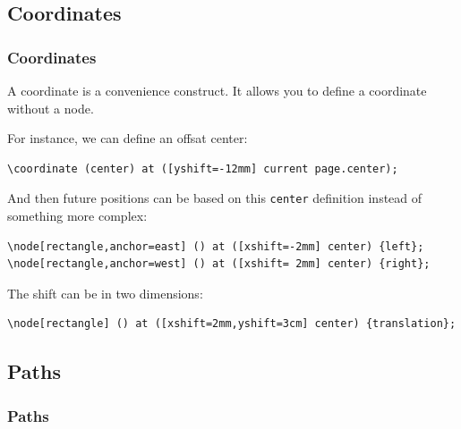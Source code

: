 \subsection{Coordinates}
\begin{frame}[fragile]
  \frametitle{Coordinates}
  \vspace{3mm}
  A coordinate is a convenience construct. It allows you to define a coordinate without a node.
  
  \pause
  \vspace{5mm}
  For instance, we can define an offsat center:
  \begin{verbatim}
\coordinate (center) at ([yshift=-12mm] current page.center);
  \end{verbatim}
  
  \pause
  \vspace{5mm}
  And then future positions can be based on this \texttt{center} definition instead of something more complex:
  \begin{verbatim}
\node[rectangle,anchor=east] () at ([xshift=-2mm] center) {left};
\node[rectangle,anchor=west] () at ([xshift= 2mm] center) {right};
  \end{verbatim}
  
  \pause
  \vspace{5mm}
  The shift can be in two dimensions:
  \begin{verbatim}
\node[rectangle] () at ([xshift=2mm,yshift=3cm] center) {translation};
  \end{verbatim}
\end{frame}

\subsection{Paths}
\begin{frame}[fragile]
  \frametitle{Paths}
  \vspace{3mm}
  
\end{frame}

